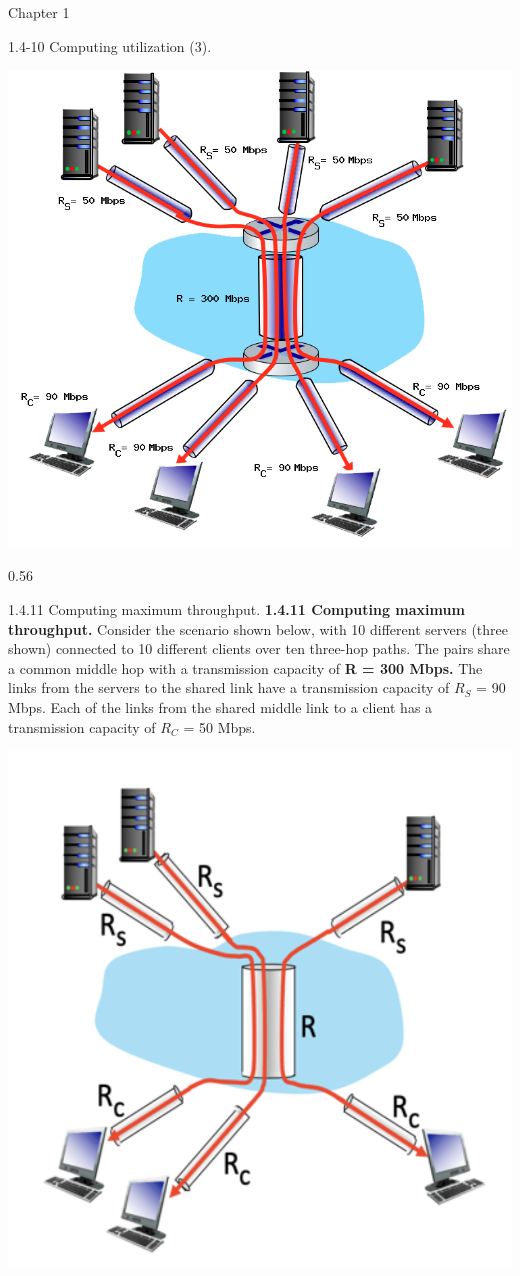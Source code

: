 \documentclass[a4paper]{article}
\begin{document}
\begin{quiz}{Chapter 1}
\begin{shortanswer}[points=1,shuffle=true]{1.4-10 Computing utilization (3).}
\begin{center}
\includegraphics[width=.7\linewidth]{figs/1.4.7.png}
\end{center}
\item 0.56
\end{shortanswer}

\begin{multi}[points=1,shuffle=true]{1.4.11 Computing maximum throughput.}
\textbf{1.4.11 Computing maximum throughput.} 
Consider the scenario shown below, with 10 different servers (three shown) connected to 10 different clients over ten three-hop paths. The pairs share a common middle hop with a transmission capacity of \textbf{R = 300 Mbps.} The links from the servers to the shared link have a transmission capacity of $R_S$ = 90 Mbps. Each of the links from the shared middle link to a client has a transmission capacity of $R_C$ = 50 Mbps.
\begin{center}
\includegraphics[width=.7\linewidth]{figs/1.4.11.png}
\end{center}


\end{multi}
\end{quiz}
\end{document}

